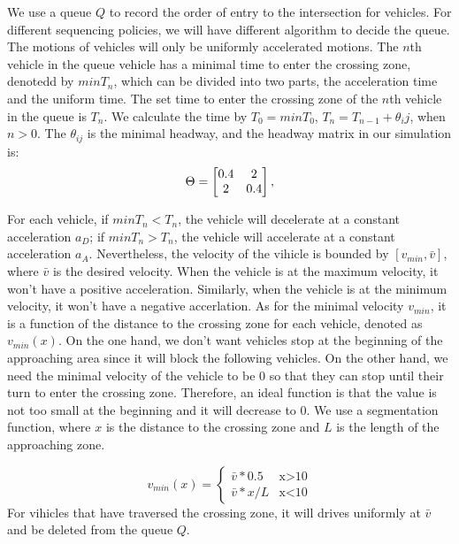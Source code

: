 \documentclass{article}
\begin{document}
We use a queue $Q$ to record the order of entry to the intersection for vehicles. For different sequencing policies, we will have different algorithm to decide the queue. The motions of vehicles will only be uniformly accelerated motions. The $n$th vehicle in the queue vehicle has a minimal time to enter the crossing zone, denotedd by $minT_n$, which can be divided into two parts, the acceleration time and the uniform time. The set time to enter the crossing zone of the $n$th vehicle in the queue is $T_n$. We calculate the time by $T_0=minT_0$, $T_n=T_{n-1}+\theta_ij$, when $n>0$. The $\theta_{ij}$ is the minimal headway, and the headway matrix in our simulation is:
\begin{align*}
  {\Theta} = 
\begin{bmatrix}
$$
0.4 & 2\\
2 & 0.4
$$
\end{bmatrix},
\end{align*}

For each vehicle, if $minT_n<T_n$, the vehicle will decelerate at a constant acceleration $a_D$; if $minT_n>T_n$, the vehicle will accelerate at a constant acceleration $a_A$. Nevertheless, the velocity of the vihicle is bounded by $[v_{min},\bar{v}]$, where $\bar{v}$ is the desired velocity. When the vehicle is at the maximum velocity, it won't have a positive acceleration. Similarly, when the vehicle is at the minimum velocity, it won't have a negative accerlation. As for the minimal velocity $v_{min}$, it is a function of the distance to the crossing zone for each vehicle, denoted as $v_{min}(x)$.  On the one hand, we don't want vehicles stop at the beginning of the approaching area since it will block the following vehicles. On the other hand, we need the minimal velocity of the vehicle to be 0 so that they can stop until their turn to enter the crossing zone. Therefore, an ideal function is that the value is not too small at the beginning and it will decrease to 0.  We use a segmentation function, where $x$ is the distance to the crossing zone and $L$ is the length of the approaching zone.

\begin{equation}
  v_{min}(x)=
  \begin{cases}
  \bar{v}*0.5&\mbox{x>10}\\
  \bar{v}*x/L&\mbox{x<10}
  \end{cases}
\end{equation}
For vihicles that have traversed the crossing zone, it will drives uniformly at $\bar{v}$ and be deleted from the queue $Q$.
\end{document}
